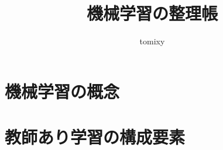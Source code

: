 \documentclass[b5paper,12pt,notitlepage]{jsreport}
\title{機械学習の整理帳}
\author{tomixy}
\begin{document}
\maketitle
\tableofcontents

\part{機械学習の概念}



\part{教師あり学習の構成要素}


\newpage
\end{document}
